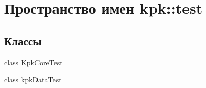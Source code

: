 \hypertarget{namespacekpk_1_1test}{}\section{Пространство имен kpk\+:\+:test}
\label{namespacekpk_1_1test}
\subsection*{Классы}
\begin{DoxyCompactItemize}
\item 
class \hyperlink{classkpk_1_1test_1_1_kpk_core_test}{Kpk\+Core\+Test}
\item 
class \hyperlink{classkpk_1_1test_1_1kpk_data_test}{kpk\+Data\+Test}
\end{DoxyCompactItemize}

